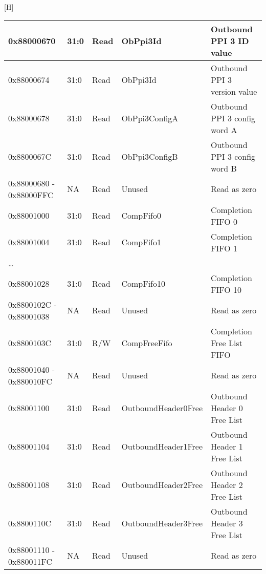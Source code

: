 \documentclass[11pt]{article}
\begin{document}
\begin{center}[H]
\begin{longtable}{| l | l | l | l | l | }
      \hline 0x88000670              & 31:0  & Read  & ObPpi3Id             & Outbound PPI 3 ID value                         \\
      \hline 0x88000674              & 31:0  & Read  & ObPpi3Id             & Outbound PPI 3 version value                      \\
      \hline 0x88000678              & 31:0  & Read  & ObPpi3ConfigA        & Outbound PPI 3 config word A              \\
      \hline 0x8800067C              & 31:0  & Read  & ObPpi3ConfigB        & Outbound PPI 3 config word B              \\
      \hline 0x88000680 - 0x88000FFC & NA    & Read  & Unused               & Read as zero                                   \\
      \hline 0x88001000              & 31:0  & Read  & CompFifo0            & Completion FIFO 0                              \\
      \hline 0x88001004              & 31:0  & Read  & CompFifo1            & Completion FIFO 1                              \\
             \ldots                  &       &            &                      &                                                \\
      \hline 0x88001028              & 31:0  & Read  & CompFifo10           & Completion FIFO 10                             \\
      \hline 0x8800102C - 0x88001038 & NA    & Read  & Unused               & Read as zero                                   \\
      \hline 0x8800103C              & 31:0  & R/W   & CompFreeFifo         & Completion Free List FIFO                      \\
      \hline 0x88001040 - 0x880010FC & NA    & Read  & Unused               & Read as zero                                   \\
      \hline 0x88001100              & 31:0  & Read  & OutboundHeader0Free  & Outbound Header 0 Free List                    \\
      \hline 0x88001104              & 31:0  & Read  & OutboundHeader1Free  & Outbound Header 1 Free List                    \\
      \hline 0x88001108              & 31:0  & Read  & OutboundHeader2Free  & Outbound Header 2 Free List                    \\
      \hline 0x8800110C              & 31:0  & Read  & OutboundHeader3Free  & Outbound Header 3 Free List                    \\
      \hline 0x88001110 - 0x880011FC & NA    & Read  & Unused               & Read as zero                                   \\
      \hline
   \end{longtable}
   \label{tab:dma_addr}
\end{center}
\end{document}
